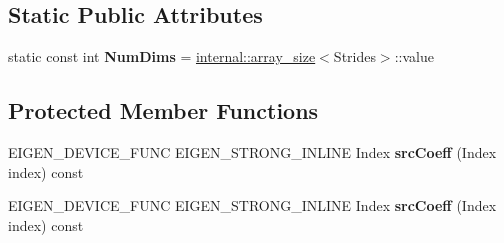 \subsection*{Static Public Attributes}
\begin{DoxyCompactItemize}
\item 
\mbox{\label{struct_eigen_1_1_tensor_evaluator_3_01const_01_tensor_striding_slicing_op_3_01_start_indices_00_cee1ff5835d6d215dedc4ac8d5000be4_aeab323cc553a43652dddba02f95ec78c}} 
static const int {\bfseries Num\+Dims} = \hyperlink{struct_eigen_1_1internal_1_1array__size}{internal\+::array\+\_\+size}$<$Strides$>$\+::value
\end{DoxyCompactItemize}
\subsection*{Protected Member Functions}
\begin{DoxyCompactItemize}
\item 
\mbox{\label{struct_eigen_1_1_tensor_evaluator_3_01const_01_tensor_striding_slicing_op_3_01_start_indices_00_cee1ff5835d6d215dedc4ac8d5000be4_a6e674c46d8e01fe653818b8fb0f02472}} 
E\+I\+G\+E\+N\+\_\+\+D\+E\+V\+I\+C\+E\+\_\+\+F\+U\+NC E\+I\+G\+E\+N\+\_\+\+S\+T\+R\+O\+N\+G\+\_\+\+I\+N\+L\+I\+NE Index {\bfseries src\+Coeff} (Index index) const
\item 
\mbox{\label{struct_eigen_1_1_tensor_evaluator_3_01const_01_tensor_striding_slicing_op_3_01_start_indices_00_cee1ff5835d6d215dedc4ac8d5000be4_a6e674c46d8e01fe653818b8fb0f02472}} 
E\+I\+G\+E\+N\+\_\+\+D\+E\+V\+I\+C\+E\+\_\+\+F\+U\+NC E\+I\+G\+E\+N\+\_\+\+S\+T\+R\+O\+N\+G\+\_\+\+I\+N\+L\+I\+NE Index {\bfseries src\+Coeff} (Index index) const
\end{DoxyCompactItemize}
